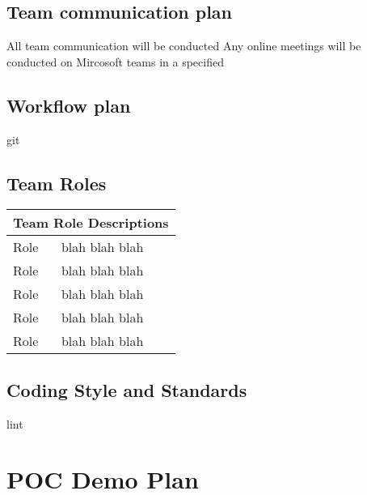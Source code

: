 \documentclass{article}
\begin{document}
\subsection{Team communication plan}
All team communication will be conducted 
Any online meetings will be conducted on Mircosoft teams in a specified 

\subsection{Workflow plan}
git

\subsection{Team Roles}
\begin{tabular}{ |p{5cm}|p{8cm}| }
	\hline
	\multicolumn{2}{|c|}{Team Role Descriptions} \\
	\hline
	Role & blah blah blah \\
	\hline
	Role & blah blah blah \\
	\hline
	Role & blah blah blah \\
	\hline
	Role & blah blah blah \\
	\hline
	Role & blah blah blah \\
	\hline
\end{tabular}

\subsection{Coding Style and Standards}
lint

\section {POC Demo Plan}
\end{document}
